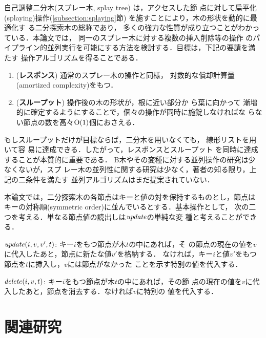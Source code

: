 \documentclass{compsoft}
\begin{document}
自己調整二分木(スプレー木, splay tree) \cite{ST85}は，アクセスした節
点に対して扁平化(splaying)操作(\ref{subsection:splaying}節)
を施すことにより，木の形状を動的に最適化す
る二分探索木の総称であり，
%
%
多くの強力な性質が成り立つことがわかっている．本論文では，
同一のスプレー木に対する複数の挿入削除等の操作
のパイプライン的並列実行を可能にする方法を検討する．目標は，下記の要請を満たす
操作アルゴリズムを得ることである．
%
\begin{enumerate}
\item ({\bf レスポンス}) 通常のスプレー木の操作と同様，
対数的な償却計算量(amortized complexity)\cite{T85}をもつ．

\item ({\bf スループット}) 操作後の木の形状が，根に近い部分か
ら葉に向かって
漸増的に確定するようにすることで，個々の操作が同時に施錠しなければな
らない節点の数を高々${\rm O}(1)$個におさえる．
\end{enumerate}
%
もしスループットだけが目標ならば，二分木を用いなくても，
線形リストを用いて容
易に達成できる．したがって，レスポンスとスループット
を同時に達成することが本質的に重要である．
%
B木やその変種に対する並列操作の研究は少なくない\cite{LS86}が，スプ
レー木の並列性に関する研究は少なく，著者の知る限り，上記の二条件を満たす
並列アルゴリズムはまだ提案されていない．

本論文では，二分探索木の各節点はキーと値の対を保持するものとし，節点は
キーの対称順(symmetric order)に並んでいるとする．基本操作として，
次の二つを考える．単なる節点値の読出しは${\it update\/}$の単純な変
種と考えることができる．

\begin{description}
\item{${\it update}(i,v,v',t)$:} キー$i$をもつ節点が木$t$の中にあれば，そ
の節点の現在の値を$v$に代入したあと，節点に新たな値$v'$を格納する．
なければ，キー$i$と値$v'$をもつ節点を$t$に挿入し，$v$には節点がなかった
ことを示す特別の値を代入する．

\item{${\it delete}(i,v,t)$:} キー$i$をもつ節点が木$t$の中にあれば，その節
点の現在の値を$v$に代入したあと，節点を消去する．なければ$v$に特別の
値を代入する．
\end{description}


\section{関連研究}
\end{document}
